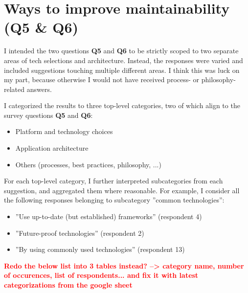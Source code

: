 \documentclass[utf8,english]{gradu3}
\newcommand{\todo}[1]{\textbf{\textcolor{red}{#1}}}
\begin{document}
\section{Ways to improve maintainability (Q5 \& Q6)}

I intended the two questions \textbf{Q5} and \textbf{Q6} to be strictly scoped to two separate areas of tech selections and architecture.
Instead, the responses were varied and included suggestions touching multiple different areas.
I think this was luck on my part, because otherwise I would not have received process- or philosophy-related answers.

I categorized the results to three top-level categories, two of which align to the survey questions \textbf{Q5} and \textbf{Q6}:
\begin{itemize}
  \item Platform and technology choices
  \item Application architecture
  \item Others (processes, best practices, philosophy, ...)
\end{itemize}

For each top-level category, I further interpreted subcategories from each suggestion, and aggregated them where reasonable.
For example, I consider all the following responses belonging to subcategory ''common technologies'':
\begin{itemize}
  \item ''Use up-to-date (but established) frameworks'' (respondent 4)
  \item ''Future-proof technologies'' (respondent 2)
  \item ''By using commonly used technologies'' (respondent 13)
\end{itemize}

\todo{%
  Redo the below list into 3 tables instead? --> category name, number of occurences, list of respondents...
}
\todo{and fix it with latest categorizations from the google sheet}
\end{document}
